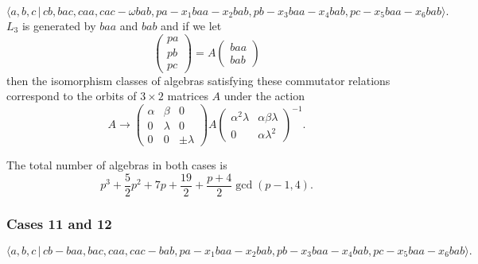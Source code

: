 \documentclass[10pt]{article}
\begin{document}
\begin{equation}
\langle a,b,c\,|\,cb,bac,caa,cac-\omega
bab,pa-x_{1}baa-x_{2}bab,pb-x_{3}baa-x_{4}bab,pc-x_{5}baa-x_{6}bab\rangle . 
\tag{7.766}
\end{equation}%
$L_{3}$ is generated by $baa$ and $bab$ and if we let 
\[
\left( 
\begin{array}{l}
pa \\ 
pb \\ 
pc%
\end{array}%
\right) =A\left( 
\begin{array}{l}
baa \\ 
bab%
\end{array}%
\right) 
\]%
then the isomorphism classes of algebras satisfying these commutator
relations correspond to the orbits of $3\times 2$ matrices $A$ under the
action 
\[
A\rightarrow \left( 
\begin{array}{lll}
\alpha & \beta & 0 \\ 
0 & \lambda & 0 \\ 
0 & 0 & \pm \lambda%
\end{array}%
\right) A\left( 
\begin{array}{ll}
\alpha ^{2}\lambda & \alpha \beta \lambda \\ 
0 & \alpha \lambda ^{2}%
\end{array}%
\right) ^{-1}. 
\]

The total number of algebras in both cases is 
\[
p^{3}+\frac{5}{2}p^{2}+7p+\frac{19}{2}+\frac{p+4}{2}\gcd (p-1,4). 
\]

\subsubsection{Cases 11 and 12}

\begin{equation}
\langle
a,b,c\,|%
\,cb-baa,bac,caa,cac-bab,pa-x_{1}baa-x_{2}bab,pb-x_{3}baa-x_{4}bab,pc-x_{5}baa-x_{6}bab\rangle .
\tag{7.767}
\end{equation}
\end{document}
